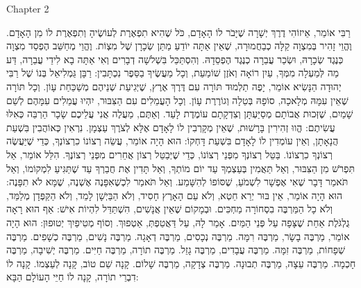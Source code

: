 Chapter 2

רַבִּי אוֹמֵר, אֵיזוֹהִי דֶרֶךְ יְשָׁרָה שֶׁיָּבֹר לוֹ הָאָדָם, כֹּל שֶׁהִיא תִפְאֶרֶת לְעוֹשֶׂיהָ וְתִפְאֶרֶת לוֹ מִן הָאָדָם. וֶהֱוֵי זָהִיר בְּמִצְוָה קַלָּה כְבַחֲמוּרָה, שֶׁאֵין אַתָּה יוֹדֵעַ מַתַּן שְׂכָרָן שֶׁל מִצְוֹת. וֶהֱוֵי מְחַשֵּׁב הֶפְסֵד מִצְוָה כְּנֶגֶד שְׂכָרָהּ, וּשְׂכַר עֲבֵרָה כְנֶגֶד הֶפְסֵדָהּ. וְהִסְתַּכֵּל בִּשְׁלשָׁה דְבָרִים וְאִי אַתָּה בָא לִידֵי עֲבֵרָה, דַּע מַה לְּמַעְלָה מִמְּךָ, עַיִן רוֹאָה וְאֹזֶן שׁוֹמַעַת, וְכָל מַעֲשֶׂיךָ בַסֵּפֶר נִכְתָּבִין:
רַבָּן גַּמְלִיאֵל בְּנוֹ שֶׁל רַבִּי יְהוּדָה הַנָּשִׂיא אוֹמֵר, יָפֶה תַלְמוּד תּוֹרָה עִם דֶּרֶךְ אֶרֶץ, שֶׁיְּגִיעַת שְׁנֵיהֶם מְשַׁכַּחַת עָוֹן. וְכָל תּוֹרָה שֶׁאֵין עִמָּהּ מְלָאכָה, סוֹפָהּ בְּטֵלָה וְגוֹרֶרֶת עָוֹן. וְכָל הָעֲמֵלִים עִם הַצִּבּוּר, יִהְיוּ עֲמֵלִים עִמָּהֶם לְשֵׁם שָׁמַיִם, שֶׁזְּכוּת אֲבוֹתָם מְסַיַּעְתָּן וְצִדְקָתָם עוֹמֶדֶת לָעַד. וְאַתֶּם, מַעֲלֶה אֲנִי עֲלֵיכֶם שָׂכָר הַרְבֵּה כְּאִלּוּ עֲשִׂיתֶם:
הֱווּ זְהִירִין בָּרָשׁוּת, שֶׁאֵין מְקָרְבִין לוֹ לָאָדָם אֶלָּא לְצֹרֶךְ עַצְמָן. נִרְאִין כְּאוֹהֲבִין בִּשְׁעַת הֲנָאָתָן, וְאֵין עוֹמְדִין לוֹ לָאָדָם בִּשְׁעַת דָּחְקוֹ:
הוּא הָיָה אוֹמֵר, עֲשֵׂה רְצוֹנוֹ כִרְצוֹנְךָ, כְּדֵי שֶׁיַּעֲשֶׂה רְצוֹנְךָ כִרְצוֹנוֹ. בַּטֵּל רְצוֹנְךָ מִפְּנֵי רְצוֹנוֹ, כְּדֵי שֶׁיְּבַטֵּל רְצוֹן אֲחֵרִים מִפְּנֵי רְצוֹנֶךָ. הִלֵּל אוֹמֵר, אַל תִּפְרֹשׁ מִן הַצִּבּוּר, וְאַל תַּאֲמִין בְּעַצְמְךָ עַד יוֹם מוֹתְךָ, וְאַל תָּדִין אֶת חֲבֵרְךָ עַד שֶׁתַּגִּיעַ לִמְקוֹמוֹ, וְאַל תֹּאמַר דָּבָר שֶׁאִי אֶפְשָׁר לִשְׁמֹעַ, שֶׁסּוֹפוֹ לְהִשָּׁמַע. וְאַל תֹּאמַר לִכְשֶׁאִפָּנֶה אֶשְׁנֶה, שֶׁמָּא לֹא תִפָּנֶה:
הוּא הָיָה אוֹמֵר, אֵין בּוּר יְרֵא חֵטְא, וְלֹא עַם הָאָרֶץ חָסִיד, וְלֹא הַבַּיְשָׁן לָמֵד, וְלֹא הַקַּפְּדָן מְלַמֵּד, וְלֹא כָל הַמַּרְבֶּה בִסְחוֹרָה מַחְכִּים. וּבְמָקוֹם שֶׁאֵין אֲנָשִׁים, הִשְׁתַּדֵּל לִהְיוֹת אִישׁ:
אַף הוּא רָאָה גֻלְגֹּלֶת אַחַת שֶׁצָּפָה עַל פְּנֵי הַמַּיִם. אָמַר לָהּ, עַל דַּאֲטֵפְתְּ, אַטְפוּךְ. וְסוֹף מְטִיפַיִךְ יְטוּפוּן:
הוּא הָיָה אוֹמֵר, מַרְבֶּה בָשָׂר, מַרְבֶּה רִמָּה. מַרְבֶּה נְכָסִים, מַרְבֶּה דְאָגָה. מַרְבֶּה נָשִׁים, מַרְבֶּה כְשָׁפִים. מַרְבֶּה שְׁפָחוֹת, מַרְבֶּה זִמָּה. מַרְבֶּה עֲבָדִים, מַרְבֶּה גָזֵל. מַרְבֶּה תוֹרָה, מַרְבֶּה חַיִּים. מַרְבֶּה יְשִׁיבָה, מַרְבֶּה חָכְמָה. מַרְבֶּה עֵצָה, מַרְבֶּה תְבוּנָה. מַרְבֶּה צְדָקָה, מַרְבֶּה שָׁלוֹם. קָנָה שֵׁם טוֹב, קָנָה לְעַצְמוֹ. קָנָה לוֹ דִבְרֵי תוֹרָה, קָנָה לוֹ חַיֵּי הָעוֹלָם הַבָּא:
